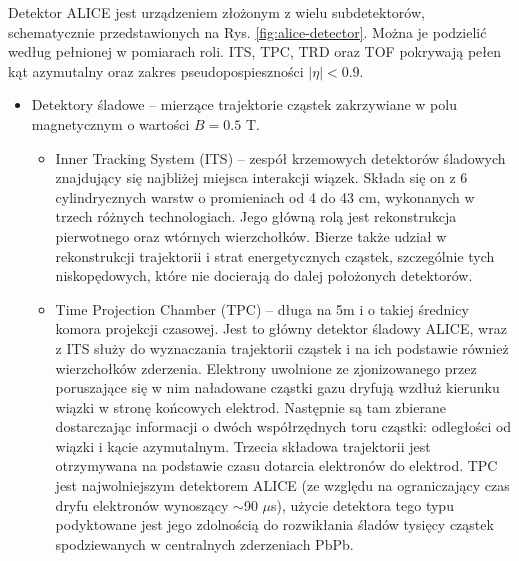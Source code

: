 Detektor ALICE jest urządzeniem złożonym z wielu subdetektorów, schematycznie przedstawionych na Rys. \ref{fig:alice-detector}. Można je podzielić według pełnionej w pomiarach roli. 
ITS, TPC, TRD oraz TOF pokrywają pełen kąt azymutalny oraz zakres pseudopospieszności $|\eta| < 0.9$.
\begin{itemize}
	\item Detektory śladowe -- mierzące trajektorie cząstek zakrzywiane w polu magnetycznym o wartości $B = 0.5$ T.
	\begin{itemize}
		\item Inner Tracking System (ITS) -- zespół krzemowych detektorów śladowych znajdujący się najbliżej miejsca interakcji wiązek. Składa się on z 6 cylindrycznych warstw o promieniach od 4 do 43 cm, wykonanych w trzech różnych technologiach. Jego główną rolą jest rekonstrukcja pierwotnego oraz wtórnych wierzchołków. Bierze także udział w rekonstrukcji trajektorii i strat energetycznych cząstek, szczególnie tych niskopędowych, które nie docierają do dalej położonych detektorów.
		\item Time Projection Chamber (TPC) -- długa na 5m i o takiej średnicy komora projekcji czasowej. Jest to główny detektor śladowy ALICE, wraz z ITS służy do wyznaczania trajektorii cząstek i na ich podstawie również wierzchołków zderzenia. Elektrony uwolnione ze zjonizowanego przez poruszające się w nim naładowane cząstki gazu dryfują wzdłuż kierunku wiązki w stronę końcowych elektrod. Następnie są tam zbierane dostarczając informacji o dwóch współrzędnych toru cząstki: odległości od wiązki i kącie azymutalnym. Trzecia składowa trajektorii jest otrzymywana na podstawie czasu dotarcia elektronów do elektrod. TPC jest najwolniejszym detektorem ALICE (ze względu na ograniczający czas dryfu elektronów wynoszący $\sim$90 $\mu$s), użycie detektora tego typu podyktowane jest jego zdolnością do rozwikłania śladów tysięcy cząstek spodziewanych w centralnych zderzeniach PbPb.
		

\end{itemize}
\end{itemize}
